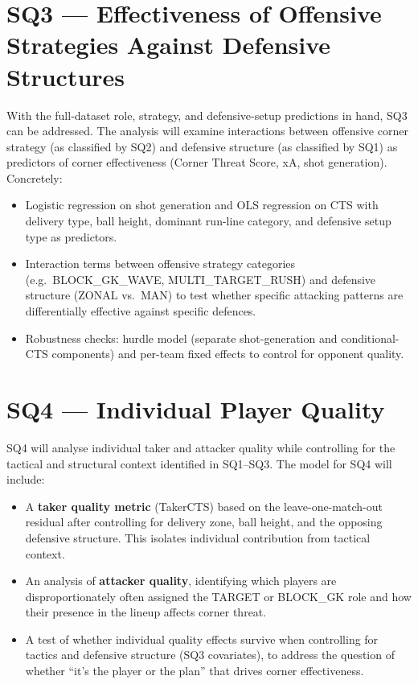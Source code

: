 \section{SQ3 — Effectiveness of Offensive Strategies Against Defensive Structures}
\label{sec:plan_sq3}

With the full-dataset role, strategy, and defensive-setup predictions
in hand, SQ3 can be addressed. The analysis will examine interactions
between offensive corner strategy (as classified by SQ2) and defensive
structure (as classified by SQ1) as predictors of corner effectiveness
(Corner Threat Score, xA, shot generation). Concretely:

\begin{itemize}
  \item Logistic regression on shot generation and OLS regression on
        CTS with delivery type, ball height, dominant run-line category,
        and defensive setup type as predictors.
  \item Interaction terms between offensive strategy categories (e.g.\
        BLOCK\_GK\_WAVE, MULTI\_TARGET\_RUSH) and defensive structure
        (ZONAL vs.\ MAN) to test whether specific attacking patterns are
        differentially effective against specific defences.
  \item Robustness checks: hurdle model (separate shot-generation and
        conditional-CTS components) and per-team fixed effects to
        control for opponent quality.
\end{itemize}

\section{SQ4 — Individual Player Quality}
\label{sec:plan_sq4}

SQ4 will analyse individual taker and attacker quality while controlling
for the tactical and structural context identified in SQ1--SQ3. The
model for SQ4 will include:

\begin{itemize}
  \item A \textbf{taker quality metric} (TakerCTS) based on the
        leave-one-match-out residual after controlling for delivery
        zone, ball height, and the opposing defensive structure. This
        isolates individual contribution from tactical context.
  \item An analysis of \textbf{attacker quality}, identifying which
        players are disproportionately often assigned the TARGET or
        BLOCK\_GK role and how their presence in the lineup affects
        corner threat.
  \item A test of whether individual quality effects survive when
        controlling for tactics and defensive structure (SQ3 covariates),
        to address the question of whether ``it's the player or the
        plan'' that drives corner effectiveness.
\end{itemize}

